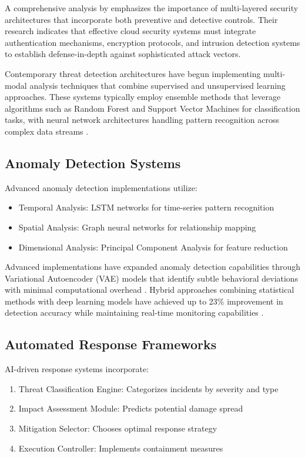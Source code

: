 \documentclass[a4paper,12pt]{article}
\begin{document}
A comprehensive analysis by \citet{alouffi2021} emphasizes the importance of multi-layered security architectures that incorporate both preventive and detective controls. Their research indicates that effective cloud security systems must integrate authentication mechanisms, encryption protocols, and intrusion detection systems to establish defense-in-depth against sophisticated attack vectors.

Contemporary threat detection architectures have begun implementing multi-modal analysis techniques that combine supervised and unsupervised learning approaches. These systems typically employ ensemble methods that leverage algorithms such as Random Forest and Support Vector Machines for classification tasks, with neural network architectures handling pattern recognition across complex data streams \citet{sarker2023}.

\subsection{Anomaly Detection Systems}
Advanced anomaly detection implementations utilize:
\begin{itemize}
    \item Temporal Analysis: LSTM networks for time-series pattern recognition
    \item Spatial Analysis: Graph neural networks for relationship mapping
    \item Dimensional Analysis: Principal Component Analysis for feature reduction
\end{itemize}

Advanced implementations have expanded anomaly detection capabilities through Variational Autoencoder (VAE) models that identify subtle behavioral deviations with minimal computational overhead \citet{mahdavifar2019}. Hybrid approaches combining statistical methods with deep learning models have achieved up to 23\% improvement in detection accuracy while maintaining real-time monitoring capabilities \citet{zhou2023}.

\subsection{Automated Response Frameworks}
AI-driven response systems incorporate:
\begin{enumerate}
    \item Threat Classification Engine: Categorizes incidents by severity and type
    \item Impact Assessment Module: Predicts potential damage spread
    \item Mitigation Selector: Chooses optimal response strategy
    \item Execution Controller: Implements containment measures
\end{enumerate}
\end{document}
